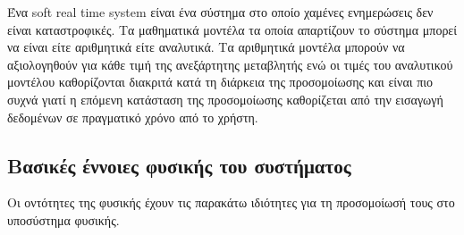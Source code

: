 Ένα soft real time system είναι ένα σύστημα στο οποίο χαμένες ενημερώσεις δεν είναι καταστροφικές.
Τα μαθηματικά μοντέλα τα οποία απαρτίζουν το σύστημα μπορεί να είναι είτε αριθμητικά είτε αναλυτικά. Τα αριθμητικά μοντέλα μπορούν να αξιολογηθούν για κάθε τιμή της ανεξάρτητης μεταβλητής ενώ οι τιμές του αναλυτικού μοντέλου καθορίζονται διακριτά κατά τη διάρκεια της προσομοίωσης και είναι πιο συχνά γιατί η επόμενη κατάσταση της προσομοίωσης καθορίζεται από την εισαγωγή δεδομένων σε πραγματικό χρόνο από το χρήστη. \cite{realtime_collision04}

\subsection{Βασικές έννοιες φυσικής του συστήματος}
Οι οντότητες της φυσικής έχουν τις παρακάτω ιδιότητες για τη προσομοίωσή τους στο υποσύστημα φυσικής.

